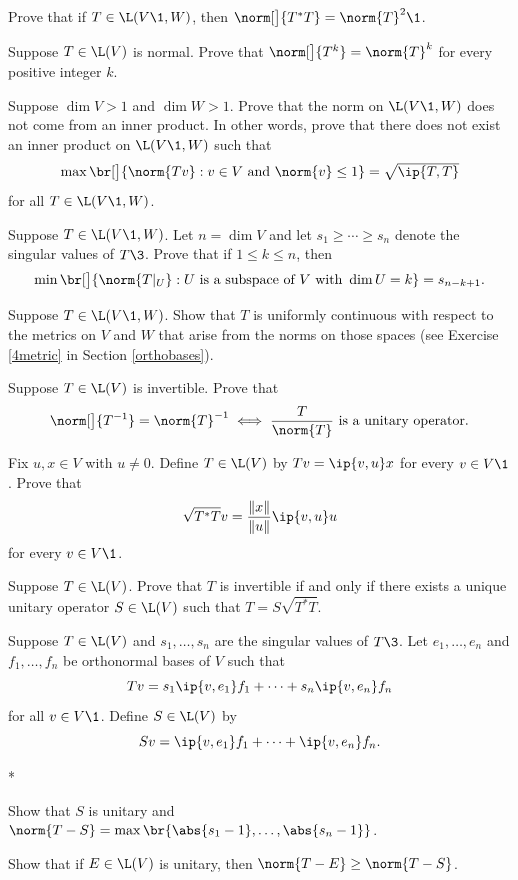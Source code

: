 \exercise
Prove that if $T \in \L(V\1, W)$, then  $\norm[\big]{T^*T} = \norm{T}^2\1$.\label{8Cstar}


\exercise
Suppose $T \in \L(V)$ is normal. Prove that $\norm[\big]{T^k} = \norm{T}^k$ for every positive integer $k$.\label{7normTk}


\exercise
Suppose $\dim V > 1$ and $\dim W > 1$. Prove that the norm on $\L(V\1, W)$ does not come from an inner product. In other words, prove that there does not exist an inner product on $\L(V\1, W)$ such that \label{6notinner}
\[
\max \br[\big]{ \norm{Tv} : v \in V \text{ and } \norm{v} \le 1} = {\textstyle \sqrt{\ip{T, T}}}
\]
for all $T \in \L(V\1, W)$.


\exercise
Suppose $T \in \L(V\1, W)$. Let $n = \dim V$ and let $s_1 \ge \cdots \ge s_n$ denote the singular values of $T\3$. Prove that if $1 \le k \le n$, then \label{7approx}
\[
\min \br[\big]{ \norm{T|_U} : U \text { is a subspace of } V \text{ with } \dim U = k} = s_{n-k+1}.
\]
\exercisedisplayend


\exercise
Suppose $T \in \L(V\1, W)$. Show that $T$ is uniformly continuous with respect to the metrics on $V$ and $W$ that arise from the norms on those spaces (see Exercise \ref{4metric} in Section \ref{orthobases}).


\exercise
Suppose $T \in \L(V)$ is invertible. Prove that
\vspace{-3bp}
\[
\norm[\big]{ T^{-1} } = \norm{T}^{-1} \iff \frac{T}{\norm{T}} \text{ is a unitary operator}.
\]
\vspace{-16bp}


\pagebreak[3]

\exercise
Fix $u, x \in V$ with $u \ne 0$. Define $T \in \L(V)$ by
$
Tv = \ip{v, u}x
$
for every $v \in V\1$.  Prove that
\[
\sqrt{T^* T}v = \frac{ \|x\| }{ \|u\| } \ip{v,u} u
\]
for every $v \in V\1$.


\exercise
Suppose $T \in \L(V)$.  Prove that $T$ is invertible if and only if there exists a
unique unitary operator $S \in \L(V)$ such that $T = S \sqrt{T^* T}$.


\exercise
Suppose $T \in \L(V)$ and $s_1, \ldots, s_n$ are the singular values of $T\3$. Let $e_1, \ldots, e_n$ and $f_1, \ldots, f_n$ be orthonormal bases of $V$ such that \label{7unitary}
\[
Tv = s_1\ip{v, e_1} f_1 + \cdots + s_n \ip{v, e_n} f_n
\]
for all $v \in V\1$. Define $S \in \L(V)$ by
\[
Sv = \ip{v, e_1} f_1 + \cdots + \ip{v, e_n} f_n.
\]
\begin{subtheorem}*
\item
Show that $S$ is unitary and $\norm{T-S} = \max \br{ \abs{s_1 -1}, \ldots, \abs{s_n - 1} }$.
\item
Show that if $E \in \L(V)$ is unitary, then $\norm{T-E} \ge \norm{T-S}$.
\end{subtheorem}


